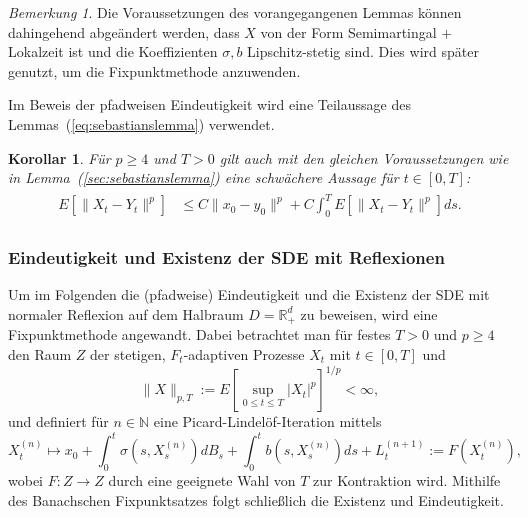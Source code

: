 \documentclass[10pt, a4paper, leqno, twoside, bibliography=totocnumbered, final]{scrartcl}
\theoremstyle{definition}
\theoremstyle{plain}%
\newtheorem{kor}[defin]{Korollar}
\theoremstyle{remark}
\newtheorem*{bem}{Bemerkung}
\begin{document}
\begin{bem}
Die Voraussetzungen des vorangegangenen Lemmas können dahingehend abgeändert werden, dass $ X $ von der Form Semimartingal $ + $ Lokalzeit ist und die Koeffizienten $ \sigma, b $ Lipschitz-stetig sind. Dies wird später genutzt, um die Fixpunktmethode anzuwenden.
\end{bem}

Im Beweis der pfadweisen Eindeutigkeit wird eine Teilaussage des Lemmas~(\ref{eq:sebastianslemma}) verwendet.

\begin{kor}
\label{sec:Korollar von sebastianslemma}
Für $ p \geq 4 $ und $ T>0 $ gilt auch mit den gleichen Voraussetzungen wie in Lemma~(\ref{sec:sebastianslemma}) eine schwächere Aussage für $ t \in [0,T] $:
\begin{align}
\begin{split}
 E \left[  \| X_t - Y_t \|^{p} \right] & \leq   C \| x_0 -y_0 \|^{p} + C \int_0^T E \left[  \| X_t - Y_t \|^{p}  \right] ds.
\end{split}
\end{align}
\label{eq:lemma-bemerkung}
\end{kor}



\subsubsection{Eindeutigkeit und Existenz der SDE mit Reflexionen}

Um im Folgenden die (pfadweise) Eindeutigkeit und die Existenz der SDE mit normaler Reflexion auf dem Halbraum $ D = \mathbb{R}^d_+ $ zu beweisen, wird eine Fixpunktmethode angewandt. Dabei betrachtet man für festes $ T > 0 $ und $ p \geq 4 $ den Raum $ Z $ der stetigen, $ F_t $-adaptiven Prozesse $ X_t $ mit $ t \in [0,T] $ und 
\begin{equation}
\| X \|_{p,T} := E \left[ \sup_{0 \leq t \leq T} | X_t |^p \right]^{1/p} < \infty ,
\end{equation}
und definiert für $ n \in \mathbb{N} $ eine Picard-Lindelöf-Iteration mittels
\begin{equation}
X^{(n)}_t \mapsto x_{0} + \int_0^t \sigma (s, X_{s}^{(n)}) dB_s + \int_0^t b(s, X_{s}^{(n)}) ds + L^{(n+1)}_t := F \left( X^{(n)}_t \right),
\end{equation}
wobei $ F : Z \to Z $ durch eine geeignete Wahl von $ T $ zur Kontraktion wird. Mithilfe des Banachschen Fixpunktsatzes folgt schließlich die Existenz und Eindeutigkeit.
\end{document}
